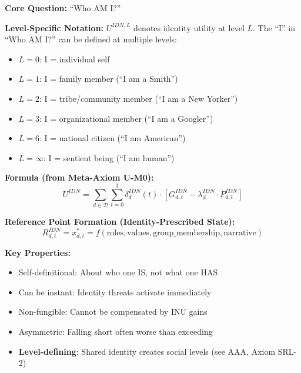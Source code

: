 \begin{tcolorbox}[colback=orange!5!white, colframe=orange!75!black, 
    title=Identity Utility (IDN)]

\textbf{Core Question:} ``Who AM I?''

\textbf{Level-Specific Notation:} $U^{IDN,L}$ denotes identity utility at level $L$.
The ``I'' in ``Who AM I?'' can be defined at multiple levels:
\begin{itemize}[nosep]
\item $L = 0$: I = individual self
\item $L = 1$: I = family member (``I am a Smith'')
\item $L = 2$: I = tribe/community member (``I am a New Yorker'')
\item $L = 3$: I = organizational member (``I am a Googler'')
\item $L = 6$: I = national citizen (``I am American'')
\item $L = \infty$: I = sentient being (``I am human'')
\end{itemize}

\textbf{Formula (from Meta-Axiom U-M0):}
\begin{equation}
U^{IDN} = \sum_{d \in \mathcal{D}} \sum_{t=0}^{3} \delta^{IDN}_{d}(t) \cdot 
\left[ G^{IDN}_{d,t} - \lambda^{IDN}_{d} \cdot P^{IDN}_{d,t} \right]
\end{equation}

\textbf{Reference Point Formation (Identity-Prescribed State):}
\begin{equation}
R^{IDN}_{d,t} = x^{*}_{d,t} = f(\text{roles}, \text{values}, \text{group\_membership}, \text{narrative})
\end{equation}

\textbf{Key Properties:}
\begin{itemize}
\item Self-definitional: About who one IS, not what one HAS
\item Can be instant: Identity threats activate immediately
\item Non-fungible: Cannot be compensated by INU gains
\item Asymmetric: Falling short often worse than exceeding
\item \textbf{Level-defining}: Shared identity creates social levels (see AAA, Axiom SRL-2)
\end{itemize}

\end{tcolorbox}

